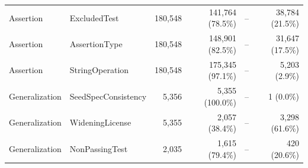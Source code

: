 \begin{tabular}{llrrrr}
  {reporttablerow}\label{tabrow:tab-exclusions-filtering-extended:Assertion@3AExcludedTest}Assertion & ExcludedTest & 180,548 & 141,764\; (\phantom{0}78.5\%) & -- & 38,784\; (21.5\%) \\
  {reporttablerow}\label{tabrow:tab-exclusions-filtering-extended:Assertion@3AAssertionType}Assertion & AssertionType & 180,548 & 148,901\; (\phantom{0}82.5\%) & -- & 31,647\; (17.5\%) \\
  {reporttablerow}\label{tabrow:tab-exclusions-filtering-extended:Assertion@3AStringOperation}Assertion & StringOperation & 180,548 & 175,345\; (\phantom{0}97.1\%) & -- & 5,203\; (\phantom{0}2.9\%) \\
  \midrule
  {reporttablerow}\label{tabrow:tab-exclusions-filtering-extended:Generalization@3ASeedSpecConsistency}Generalization & SeedSpecConsistency & 5,356 & 5,355\; (100.0\%) & -- & 1\; (\phantom{0}0.0\%) \\
  {reporttablerow}\label{tabrow:tab-exclusions-filtering-extended:Generalization@3AWideningLicense}Generalization & WideningLicense & 5,355 & 2,057\; (\phantom{0}38.4\%) & -- & 3,298\; (61.6\%) \\
  {reporttablerow}\label{tabrow:tab-exclusions-filtering-extended:Generalization@3ANonPassingTest}Generalization & NonPassingTest & 2,035 & 1,615\; (\phantom{0}79.4\%) & -- & 420\; (20.6\%) \\
  \bottomrule
  \end{tabular}
